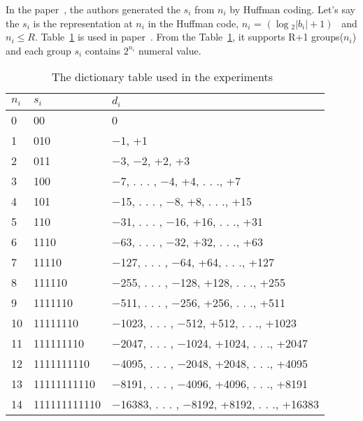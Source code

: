 In the paper~\cite{marcelloni2008simple}, the authors generated the $s_i$ from
$n_i$ by Huffman coding. Let's say the $s_i$ is the representation at $n_i$ in
the Huffman code, $n_i$ = $(\log{_2}{\left|{b_i}\right|} +
1)$~\cite{li2016temporal} and $n_i \leq R$. Table~\ref{table:LEC} is used in
paper~\cite{marcelloni2009efficient}. From the Table~\ref{table:LEC}, it
supports R+1 groups($n_i$) and each group $s_i$ contains $2^{n_i}$ numeral
value.  
\begin{table}[]
\begin{tabular}{|l|l|l|}
\hline
$n_i$ & $s_i$        & $d_i$                                       \\ \hline
0     & 00           & 0                                           \\ 
1     & 010          & −1, +1                                      \\
2     & 011          & −3, −2, +2, +3                              \\
3     & 100          & −7, . . . , −4, +4, . . ., +7               \\
4     & 101          & −15, . . . , −8, +8, . . ., +15             \\
5     & 110          & −31, . . . , −16, +16, . . ., +31           \\
6     & 1110         & −63, . . . , −32, +32, . . ., +63           \\
7     & 11110        & −127, . . . , −64, +64, . . ., +127         \\
8     & 111110       & −255, . . . , −128, +128, . . ., +255       \\
9     & 1111110      & −511, . . . , −256, +256, . . ., +511       \\
10    & 11111110     & −1023, . . . , −512, +512, . . ., +1023     \\
11    & 111111110    & −2047, . . . , −1024, +1024, . . ., +2047   \\
12    & 1111111110   & −4095, . . . , −2048, +2048, . . ., +4095   \\
13    & 11111111110  & −8191, . . . , −4096, +4096, . . ., +8191   \\
14    & 111111111110 & −16383, . . . , −8192, +8192, . . ., +16383 \\
\hline
\end{tabular}
\caption{The dictionary table used in the experiments~\cite{marcelloni2009efficient}}
\label{table:LEC}
\end{table}
 
